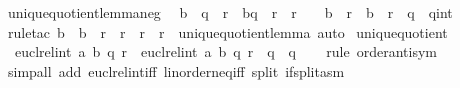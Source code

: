 \begin{isabellebody}
%
\endisadelimproof
\isanewline
{}\isamarkupfalse%
\ unique{\isacharunderscore}{\kern0pt}quotient{\isacharunderscore}{\kern0pt}lemma{\isacharunderscore}{\kern0pt}neg{\isacharcolon}{\kern0pt}\isanewline
\ \ {\isachardoublequoteopen}b\ {\isacharasterisk}{\kern0pt}\ q{\isacharprime}{\kern0pt}\ {\isacharplus}{\kern0pt}\ r{\isacharprime}{\kern0pt}\ {\isasymle}\ b{\isacharasterisk}{\kern0pt}q\ {\isacharplus}{\kern0pt}\ r\ {\isasymLongrightarrow}\ r\ {\isasymle}\ {}\ {\isasymLongrightarrow}\ b\ {\isacharless}{\kern0pt}\ r\ {\isasymLongrightarrow}\ b\ {\isacharless}{\kern0pt}\ r{\isacharprime}{\kern0pt}\ {\isasymLongrightarrow}\ q\ {\isasymle}\ {\isacharparenleft}{\kern0pt}q{\isacharprime}{\kern0pt}{\isacharcolon}{\kern0pt}{\isacharcolon}{\kern0pt}int{\isacharparenright}{\kern0pt}{\isachardoublequoteclose}\isanewline
%
\isadelimproof
\ \ %
\endisadelimproof
%
\isatagproof
{}\isamarkupfalse%
\ {\isacharparenleft}{\kern0pt}rule{\isacharunderscore}{\kern0pt}tac\ b\ {\isacharequal}{\kern0pt}\ {\isachardoublequoteopen}{\isacharminus}{\kern0pt}b{\isachardoublequoteclose}\ \ r\ {\isacharequal}{\kern0pt}\ {\isachardoublequoteopen}{\isacharminus}{\kern0pt}r{\isacharprime}{\kern0pt}{\isachardoublequoteclose}\ \ r{\isacharprime}{\kern0pt}\ {\isacharequal}{\kern0pt}\ {\isachardoublequoteopen}{\isacharminus}{\kern0pt}r{\isachardoublequoteclose}\ \ unique{\isacharunderscore}{\kern0pt}quotient{\isacharunderscore}{\kern0pt}lemma{\isacharparenright}{\kern0pt}\ auto%
\endisatagproof
{\isafoldproof}%
%
\isadelimproof
\isanewline
%
\endisadelimproof
\isanewline
{}\isamarkupfalse%
\ unique{\isacharunderscore}{\kern0pt}quotient{\isacharcolon}{\kern0pt}\isanewline
\ \ {\isachardoublequoteopen}eucl{\isacharunderscore}{\kern0pt}rel{\isacharunderscore}{\kern0pt}int\ a\ b\ {\isacharparenleft}{\kern0pt}q{\isacharcomma}{\kern0pt}\ r{\isacharparenright}{\kern0pt}\ {\isasymLongrightarrow}\ eucl{\isacharunderscore}{\kern0pt}rel{\isacharunderscore}{\kern0pt}int\ a\ b\ {\isacharparenleft}{\kern0pt}q{\isacharprime}{\kern0pt}{\isacharcomma}{\kern0pt}\ r{\isacharprime}{\kern0pt}{\isacharparenright}{\kern0pt}\ {\isasymLongrightarrow}\ q\ {\isacharequal}{\kern0pt}\ q{\isacharprime}{\kern0pt}{\isachardoublequoteclose}\isanewline
%
\isadelimproof
\ \ %
\endisadelimproof
%
\isatagproof
{}\isamarkupfalse%
\ {\isacharparenleft}{\kern0pt}rule\ order{\isacharunderscore}{\kern0pt}antisym{\isacharparenright}{\kern0pt}\isanewline
\ \ \ \isamarkupfalse%
\ {\isacharparenleft}{\kern0pt}simp{\isacharunderscore}{\kern0pt}all\ add{\isacharcolon}{\kern0pt}\ eucl{\isacharunderscore}{\kern0pt}rel{\isacharunderscore}{\kern0pt}int{\isacharunderscore}{\kern0pt}iff\ linorder{\isacharunderscore}{\kern0pt}neq{\isacharunderscore}{\kern0pt}iff\ split{\isacharcolon}{\kern0pt}\ if{\isacharunderscore}{\kern0pt}split{\isacharunderscore}{\kern0pt}asm{\isacharparenright}{\kern0pt}\isanewline

\end{isabellebody}
